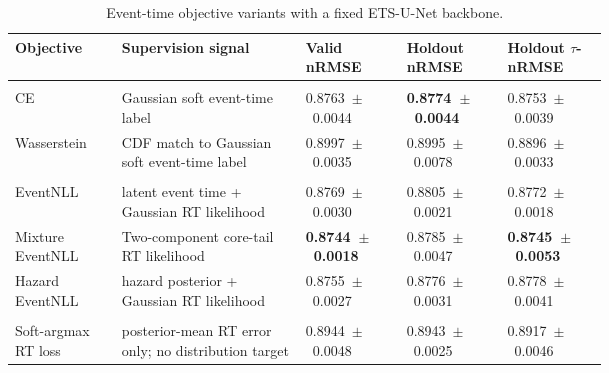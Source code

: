\documentclass[12pt]{article}
\begin{document}
\begin{table}[!htbp]
\centering
\caption{Event-time objective variants with a fixed ETS-U-Net backbone.}
\label{tab:r11_segmentation_losses}
\footnotesize
\setlength{\tabcolsep}{2pt}
\renewcommand{\arraystretch}{1.15}
\begin{tabularx}{\linewidth}{@{} >{\RaggedRight\arraybackslash}p{0.18\linewidth} Y >{\centering\arraybackslash}p{0.17\linewidth} >{\centering\arraybackslash}p{0.17\linewidth} >{\centering\arraybackslash}p{0.17\linewidth} @{}}
\toprule
\textbf{Objective} & \textbf{Supervision signal} & \textbf{Valid nRMSE} & \textbf{Holdout nRMSE} & \textbf{Holdout \(\tau\)-nRMSE} \\
\midrule
{} \\
\addlinespace[0.15em]
CE & Gaussian soft event-time label & \mbox{0.8763 $\pm$ 0.0044} & \textbf{\mbox{0.8774 $\pm$ 0.0044}} & \mbox{0.8753 $\pm$ 0.0039} \\
Wasserstein & CDF match to Gaussian soft event-time label & \mbox{0.8997 $\pm$ 0.0035} & \mbox{0.8995 $\pm$ 0.0078} & \mbox{0.8896 $\pm$ 0.0033} \\
\midrule
{} \\
\addlinespace[0.15em]
EventNLL & latent event time + Gaussian RT likelihood & \mbox{0.8769 $\pm$ 0.0030} & \mbox{0.8805 $\pm$ 0.0021} & \mbox{0.8772 $\pm$ 0.0018} \\
Mixture EventNLL & Two-component core-tail RT likelihood & \textbf{\mbox{0.8744 $\pm$ 0.0018}} & \mbox{0.8785 $\pm$ 0.0047} & \textbf{\mbox{0.8745 $\pm$ 0.0053}} \\
Hazard EventNLL & hazard posterior + Gaussian RT likelihood & \mbox{0.8755 $\pm$ 0.0027} & \mbox{0.8776 $\pm$ 0.0031} & \mbox{0.8778 $\pm$ 0.0041} \\
\midrule
{} \\
\addlinespace[0.15em]
Soft-argmax RT loss & posterior-mean RT error only; no distribution target & \mbox{0.8944 $\pm$ 0.0048} & \mbox{0.8943 $\pm$ 0.0025} & \mbox{0.8917 $\pm$ 0.0046} \\
\bottomrule
\end{tabularx}
\end{table}
\FloatBarrier
\end{document}
